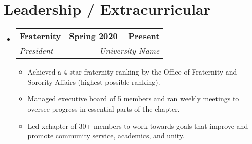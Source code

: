 \documentclass[letterpaper,11pt]{article}
\makeatletter
\newcommand{\resumeItem}[1]{
    \item\small{
            {#1 \vspace{-2pt}}
    }
}
\newcommand{\resumeSubheading}[4]{
    \vspace{-2pt}\item
    \begin{tabular*}{1.0\textwidth}[t]{l@{\extracolsep{\fill}}r}
        \textbf{#1} & \textbf{\small #2} \\
        \textit{\small#3} & \textit{\small #4} \\
    \end{tabular*}\vspace{-7pt}
}
\newcommand{\resumeSubHeadingListStart}{\begin{itemize}[leftmargin=0.0in, label={}]}
\newcommand{\resumeSubHeadingListEnd}{\end{itemize}}
\newcommand{\resumeItemListStart}{\begin{itemize}}
\newcommand{\resumeItemListEnd}{\end{itemize}\vspace{-5pt}}
\makeatother
\begin{document}
\section{Leadership / Extracurricular}
\resumeSubHeadingListStart
\resumeSubheading{Fraternity}{Spring 2020 -- Present}{President}{University Name}
\resumeItemListStart
\resumeItem{Achieved a 4 star fraternity ranking by the Office of Fraternity and Sorority Affairs (highest possible ranking).}
\resumeItem{Managed executive board of 5 members and ran weekly meetings to oversee progress in essential parts of the chapter.}
\resumeItem{Led xchapter of 30+ members to work towards goals that improve and promote community service, academics, and unity.}
\resumeItemListEnd

\resumeSubHeadingListEnd
\end{document}
